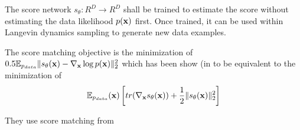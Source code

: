 The score network $s_\theta: R^D \to R^D$ shall be trained to estimate the score without estimating the data likelihood $p({\mathbf{x}})$ first. Once trained, it can be used within Langevin dynamics sampling to generate new data examples.

The score matching objective is the minimization of $0.5 \mathbb{E}_{p_{data}} \Vert s_{\theta}({\mathbf{x}}) - \nabla_{{\mathbf{x}}} \log p({\mathbf{x}}) \Vert_2^2$ which has been show (in \cite{hyvarinen_estimation_nodate} to be equivalent to the minimization of
\begin{align*}
\mathbb{E}_{p_{data}}({\mathbf{x}}) \left[ tr(\nabla_{\mathbf{x}} s_\theta({\mathbf{x}})) + \frac{1}{2} \Vert s_\theta({\mathbf{x}}) \Vert_2^2 \right]
\end{align*}

They use score matching from \parencite{hyvarinen_estimation_nodate}
